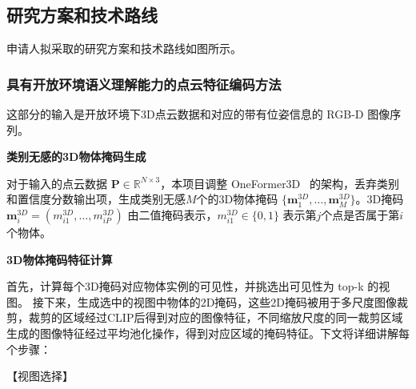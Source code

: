 \documentclass[12pt]{article}
\newcommand{\myEmph}[1]{\textbf{\textcolor[rgb]{0,0,0.25}{#1}}}
\begin{document}
\subsection{研究方案和技术路线}
申请人拟采取的研究方案和技术路线如图所示。


\subsubsection{具有开放环境语义理解能力的点云特征编码方法}

这部分的输入是开放环境下3D点云数据和对应的带有位姿信息的 RGB-D 图像序列。

\myEmph{类别无感的3D物体掩码生成}

对于输入的点云数据 $\boldsymbol{P}\in \mathbb{R}^{N\times 3}$，本项目调整 OneFormer3D~\cite{kolodiazhnyi2024oneformer3d} 的架构，丢弃类别和置信度分数输出项，生成类别无感$M$个的3D物体掩码
$\{\boldsymbol{m}_{1}^{3D},\dots,\boldsymbol{m}_{M}^{3D}\}$。3D掩码$\boldsymbol{m}_i^{3D} = (m_{i1}^{3D},\dots,m_{iP}^{3D})$ 由二值掩码表示，$m_{i1}^{3D} \in \{0,1\}$ 表示第$j$个点是否属于第$i$个物体。




\myEmph{3D物体掩码特征计算}

首先，计算每个3D掩码对应物体实例的可见性，并挑选出可见性为 top-k 的视图。
接下来，生成选中的视图中物体的2D掩码，这些2D掩码被用于多尺度图像裁剪，裁剪的区域经过CLIP后得到对应的图像特征，不同缩放尺度的同一裁剪区域生成的图像特征经过平均池化操作，得到对应区域的掩码特征。下文将详细讲解每个步骤：

【视图选择】
\end{document}
